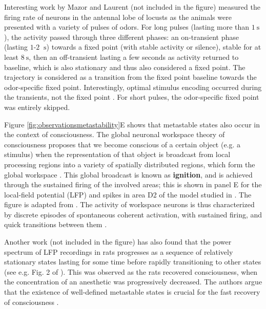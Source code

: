 \documentclass[reprint,onecolumn,superscriptaddress,showpacs,amsmath,amssymb,aps,floatfix]{revtex4-2}
\theoremstyle{definition}
\newcommand{\Emph}[1]{\textbf{#1}}
\begin{document}
Interesting work by Mazor and Laurent \cite{mazor2005transient} (not included in the figure) measured the firing rate of neurons in the antennal lobe of locusts as the animals were presented with a variety of pulses of odors. For long pulses (lasting more than $\SI{1}{\second}$), the activity passed through three different phases: an on-transient phase (lasting $1$-$2$ $\SI{}{\second}$) towards a fixed point (with stable activity or silence), stable for at least $\SI{8}{\second}$, then an off-transient lasting a few seconds as activity returned to baseline, which is also stationary and thus also considered a fixed point. The trajectory is considered as a transition from the fixed point baseline towards the odor-specific fixed point. 
Interestingly, optimal stimulus encoding occurred during the transients, not the fixed point  \cite{mazor2005transient}. For short pulses, the odor-specific fixed point was entirely skipped.


Figure \ref{fig:observationsmetastability}E shows that metastable states also occur in the context of consciousness. The global neuronal workspace theory of consciousness proposes that we become conscious of a certain object (e.g. a stimulus) when the representation of that object is broadcast from local processing regions into a variety of spatially distributed regions, which form the global workspace \cite{mashour2020conscious}. This global broadcast is known as \Emph{ignition}, and is achieved through the sustained firing of the involved areas; this is shown in panel E for the local-field potential (LFP) and spikes in area D2 of the model studied in \cite{dehaene2005ongoing}. The figure is adapted from \cite{dehaene2005ongoing}. The activity of workspace neurons is thus characterized by discrete episodes of spontaneous coherent activation, with sustained firing, and quick transitions between them \cite{michel2017eeg}.

Another work (not included in the figure) has also found that the power spectrum of LFP recordings in rats progresses as a sequence of relatively stationary states lasting for some time before rapidly transitioning to other states \cite{hudson2014recovery} (see e.g. Fig. 2 of \cite{hudson2014recovery}). This was observed as the rats recovered consciousness, when the concentration of an anesthetic was progressively decreased. The authors argue that the existence of well-defined metastable states is crucial for the fast recovery of consciousness \cite{hudson2014recovery}.
\end{document}
